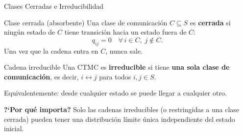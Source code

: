 \documentclass[aspectratio=1610, 10pt]{beamer}
\begin{document}
\begin{frame}{Clases Cerradas e Irreducibilidad}
  \begin{block}{Clase cerrada (absorbente)}
    Una clase de comunicaci\'{o}n $C \subseteq S$ es \textbf{cerrada} si
    ning\'{u}n estado de $C$ tiene transici\'{o}n hacia un estado fuera de $C$:
    \[
      q_{ij} = 0 \quad \forall\, i \in C,\; j \notin C.
    \]
    Una vez que la cadena entra en $C$, nunca sale.
  \end{block}

  \begin{block}{Cadena irreducible}
    Una CTMC es \textbf{irreducible} si tiene \textbf{una sola clase de comunicaci\'{o}n},
    es decir, $i \leftrightarrow j$ para todos $i, j \in S$.

    Equivalentemente: desde cualquier estado se puede llegar a cualquier otro.
  \end{block}

  \vspace{4pt}
  \textbf{?`Por qu\'{e} importa?} Solo las cadenas irreducibles (o restringidas a una clase cerrada)
  pueden tener una distribuci\'{o}n l\'{i}mite \'{u}nica independiente del estado inicial.
\end{frame}
\end{document}
